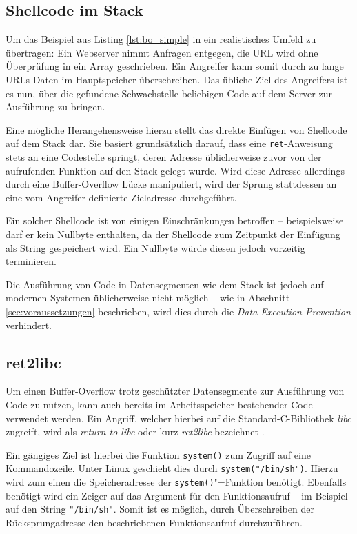 \subsection{Shellcode im Stack}

Um das Beispiel aus Listing \ref{lst:bo_simple} in ein realistisches Umfeld zu übertragen: Ein Webserver nimmt Anfragen entgegen, die URL wird ohne Überprüfung in ein Array geschrieben. Ein Angreifer kann somit durch zu lange URLs Daten im Hauptspeicher überschreiben. Das übliche Ziel des Angreifers ist es nun, über die gefundene Schwachstelle beliebigen Code auf dem Server zur Ausführung zu bringen.

Eine mögliche Herangehensweise hierzu stellt das direkte Einfügen von Shellcode auf dem Stack dar. Sie basiert grundsätzlich darauf, dass eine \texttt{ret}-Anweisung stets an eine Codestelle springt, deren Adresse üblicherweise zuvor von der aufrufenden Funktion auf den Stack gelegt wurde. Wird diese Adresse allerdings durch eine Buffer-Overflow Lücke manipuliert, wird der Sprung stattdessen an eine vom Angreifer definierte Zieladresse durchgeführt.

Ein solcher Shellcode ist von einigen Einschränkungen betroffen -- beispielsweise darf er kein Nullbyte enthalten, da der Shellcode zum Zeitpunkt der Einfügung als String gespeichert wird. Ein Nullbyte würde diesen jedoch vorzeitig terminieren.

Die Ausführung von Code in Datensegmenten wie dem Stack ist jedoch auf modernen Systemen üblicherweise nicht möglich -- wie in Abschnitt \ref{sec:voraussetzungen} beschrieben, wird dies durch die \emph{Data Execution Prevention} verhindert.

\subsection{ret2libc}

Um einen Buffer-Overflow trotz geschützter Datensegmente zur Ausführung von Code zu nutzen, kann auch bereits im Arbeitsspeicher bestehender Code verwendet werden. Ein Angriff, welcher hierbei auf die Standard-C-Bibliothek \emph{libc} zugreift, wird als \emph{return to libc} oder kurz \emph{ret2libc} bezeichnet \cite[S.\,412]{Erickson.2009}.

Ein gängiges Ziel ist hierbei die Funktion \texttt{system()} zum Zugriff auf eine Kommandozeile. Unter Linux geschieht dies durch \texttt{system("/bin/sh")}. Hierzu wird zum einen die Speicheradresse der \texttt{system()}"=Funktion benötigt. Ebenfalls benötigt wird ein Zeiger auf das Argument für den Funktionsaufruf -- im Beispiel auf den String \texttt{"/bin/sh"}. Somit ist es möglich, durch Überschreiben der Rücksprungadresse den beschriebenen Funktionsaufruf durchzuführen.


